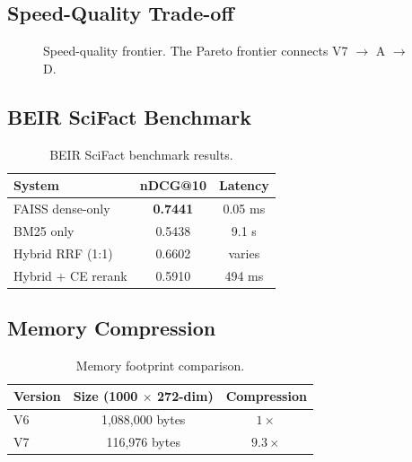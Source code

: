 \documentclass[12pt,a4paper]{article}
\theoremstyle{definition}
\theoremstyle{remark}
\begin{document}
\subsection{Speed-Quality Trade-off}

\begin{figure}[H]
\centering
{}
\caption{Speed-quality frontier. The Pareto frontier connects V7 $\to$ A $\to$ D.}
\label{fig:pareto}
\end{figure}

\subsection{BEIR SciFact Benchmark}

\begin{table}[H]
\centering
\caption{BEIR SciFact benchmark results.}
\label{tab:beir}
\begin{tabular}{lcc}
\toprule
\textbf{System} & \textbf{nDCG@10} & \textbf{Latency} \\
\midrule
FAISS dense-only & \textbf{0.7441} & 0.05 ms \\
BM25 only & 0.5438 & 9.1 s \\
Hybrid RRF (1:1) & 0.6602 & varies \\
Hybrid + CE rerank & 0.5910 & 494 ms \\
\bottomrule
\end{tabular}
\end{table}

\subsection{Memory Compression}

\begin{table}[H]
\centering
\caption{Memory footprint comparison.}
\label{tab:compression}
\begin{tabular}{lcc}
\toprule
\textbf{Version} & \textbf{Size (1000 $\times$ 272-dim)} & \textbf{Compression} \\
\midrule
V6 & 1,088,000 bytes & $1\times$ \\
V7 & 116,976 bytes & $9.3\times$ \\
\bottomrule
\end{tabular}
\end{table}
\end{document}
